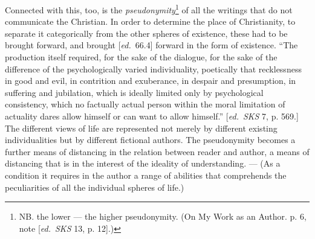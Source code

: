 \documentclass[12pt,a4paper,openany]{book}
\newcommand{\kpage}[1]{\marginnote{\footnotesize\textit{[#1]}}}
\newcommand{\ed}[1]{{\small[\textit{ed.}\ #1]}}
\begin{document}
Connected with this, too, is the \emph{pseudonymity}\footnote[31]{NB. the lower
--- the higher pseudonymity. (On My Work as an Author. p. 6, note \ed{\emph{SKS}
13, p. 12}.)} of all the writings that do not communicate the Christian. In
order to determine the place of Christianity, to separate it categorically from
the other spheres of existence, these had to be brought forward, and brought
\ed{66.4} forward in the form of existence. ``The production itself required,
for the sake of the dialogue, for the sake of the difference of the
psychologically varied individuality, poetically that recklessness in good and
evil, in contrition and exuberance, in despair and presumption, in suffering and
jubilation, which is ideally limited only by psychological consistency, which no
factually actual person within the moral limitation of actuality dares allow
himself or can want to allow himself.'' \ed{\emph{SKS} 7, p. 569.} The different
views of life are represented not merely by different existing individualities
but by different\kpage{105} fictional authors. The pseudonymity becomes a
further means of distancing in the relation between reader and author, a means
of distancing that is in the interest of the ideality of understanding. --- (As
a condition it requires in the author a range of abilities that comprehends the
peculiarities of all the individual spheres of life.)
\end{document}
